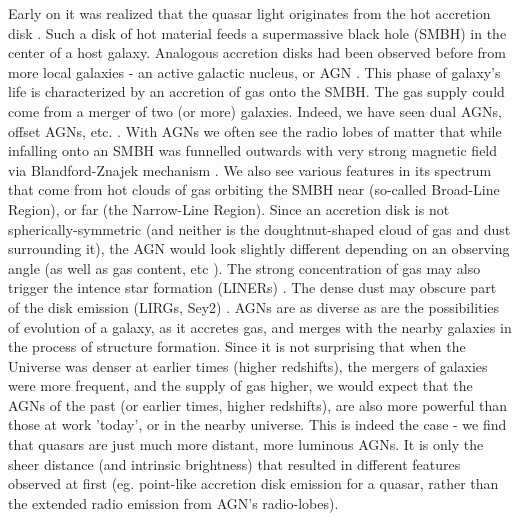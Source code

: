 \documentclass[modern]{aastex62}
\begin{document}
Early on it was realized that the quasar light originates from the hot accretion disk \citep{oke1965, burbidge1967}. Such a disk of hot material feeds a supermassive black hole (SMBH) in the center of a host galaxy. Analogous accretion disks had been observed before from more local galaxies - an active galactic nucleus, or AGN \citep{netzer2013}. This phase of galaxy's life is characterized by an accretion of gas onto the SMBH. The gas supply could come from a merger of two (or more) galaxies. Indeed, we have seen dual AGNs, offset AGNs, etc. \citep{kormendy2013, muller2016}. With AGNs we often see the radio lobes of matter that while infalling onto an SMBH was funnelled outwards with very strong magnetic field via Blandford-Znajek mechanism \citep{blandford1977}. We also see various features in its spectrum that come from hot clouds of gas orbiting the SMBH near (so-called Broad-Line Region), or far (the Narrow-Line Region). Since an accretion disk is not spherically-symmetric (and neither is the doughtnut-shaped cloud of gas and dust surrounding it), the AGN would look slightly different depending on an observing angle  \citep{marin2017, lawrence2016a} (as well as gas content, etc \cite{veilleux2016}). The strong concentration of gas may also trigger the intence star formation (LINERs) \citep{maiolino2003, mingo2016,  hernandez2016}. The dense  dust may obscure part of the disk emission (LIRGs, Sey2) \citep{symeonidis2017, lamassa2017}. AGNs are as diverse as are the possibilities of evolution of a galaxy, as it accretes gas, and merges with the nearby galaxies in the process of structure formation. Since it is not surprising that when the Universe was denser at earlier times (higher redshifts), the mergers of galaxies were more frequent, and the supply of gas higher, we would expect that the AGNs of the past (or earlier times, higher redshifts), are also more powerful than those at work 'today', or in the nearby universe. This is indeed the case - we find that quasars are just much more distant, more luminous AGNs. It is only the sheer distance (and intrinsic brightness) that resulted in different features observed at first (eg. point-like accretion disk emission for a quasar, rather than the extended radio emission from AGN's radio-lobes). 
\end{document}
